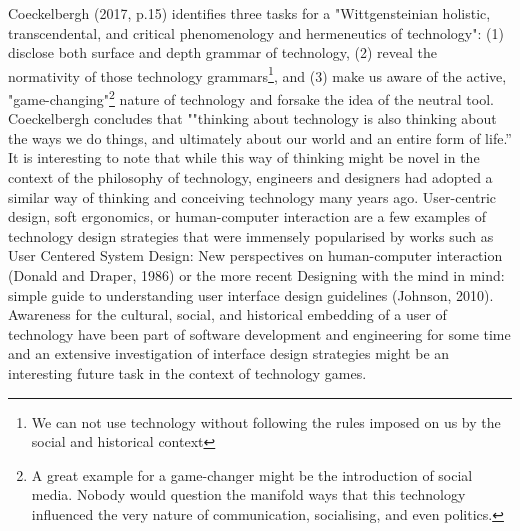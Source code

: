 Coeckelbergh (2017, p.15) identifies three tasks for a "Wittgensteinian holistic, transcendental, and critical phenomenology and hermeneutics of
technology": (1) disclose both surface and depth grammar of technology, (2) reveal the normativity of those technology
grammars\footnote{We can not use technology without following the rules imposed on us by the social and historical context}, and (3) make us
aware of the active, "game-changing"\footnote{A great example for a game-changer might be the introduction of social media. Nobody
would question the manifold ways that this technology influenced the very nature of communication, socialising, and even politics.} nature
of technology and forsake the idea of the neutral tool. Coeckelbergh concludes that ""thinking about technology is also thinking about the
ways we do things, and ultimately about our world and an entire form of life.” It is interesting to note that while this way of thinking might
be novel in the context of the philosophy of technology, engineers and designers had adopted a similar way of thinking and conceiving
technology many years ago. User-centric design, soft ergonomics, or human-computer interaction are a few examples of technology design
strategies that were immensely popularised by works such as User Centered System Design: New perspectives on human-computer interaction
(Donald and Draper, 1986) or the more recent Designing with the mind in mind: simple guide to understanding user interface design
guidelines (Johnson, 2010). Awareness for the cultural, social, and historical embedding of a user of technology have been part of software
development and engineering for some time and an extensive investigation of interface design strategies might be an interesting future task in
the context of technology games.